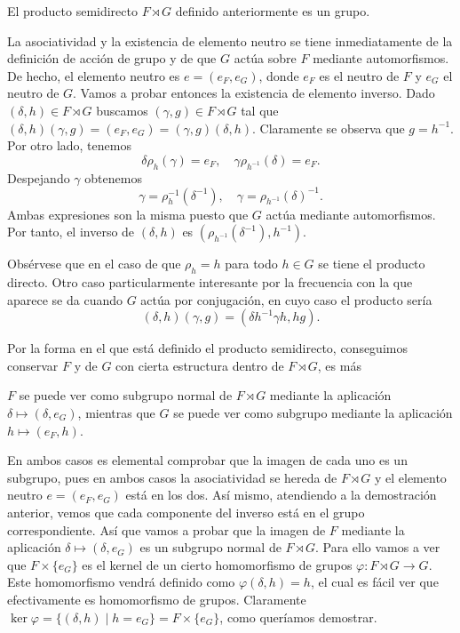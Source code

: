 \documentclass[TFG.tex]{subfiles}
\begin{document}
\begin{prop}
El producto semidirecto $F\rtimes G$ definido anteriormente es un grupo.
\end{prop}
\begin{dem}
La asociatividad y la existencia de elemento neutro se tiene inmediatamente de la definición de acción de grupo y de que $G$ actúa sobre $F$ mediante automorfismos. De hecho, el elemento neutro es $e=(e_F,e_G)$, donde $e_F$ es el neutro de $F$ y $e_G$ el neutro de $G$. Vamos a probar entonces la existencia de elemento inverso. Dado $(\delta,h)\in F\rtimes G$ buscamos $(\gamma,g)\in F\rtimes G$ tal que $(\delta,h)(\gamma,g)=(e_F,e_G)=(\gamma,g)(\delta,h)$. Claramente se observa que $g=h^{-1}$. Por otro lado, tenemos
\[
\delta\rho_h(\gamma)=e_F, \quad \gamma \rho_{h^{-1}}(\delta)=e_F.
\]
Despejando $\gamma$ obtenemos
\[
\gamma=\rho_{h}^{-1}(\delta^{-1}),\quad \gamma=\rho_{h^{-1}}(\delta)^{-1}.
\]
Ambas expresiones son la misma puesto que $G$ actúa mediante automorfismos. Por tanto, el inverso de $(\delta,h)$ es $(\rho_{h^{-1}}(\delta^{-1}), h^{-1})$. \QED
\end{dem}

 Obsérvese que en el caso de que $\rho_h=h$ para todo $h\in G$ se tiene el producto directo. Otro caso particularmente interesante por la frecuencia con la que aparece se da cuando $G$ actúa por conjugación, en cuyo caso el producto sería
\[
(\delta,h)(\gamma,g)=(\delta h^{-1}\gamma h,hg).
\]

Por la forma en el que está definido el producto semidirecto, conseguimos conservar $F$ y de $G$ con cierta estructura dentro de $F\rtimes G$, es más 
\begin{prop}
 $F$ se puede ver como subgrupo normal de $F\rtimes G$ mediante la aplicación $\delta\mapsto (\delta,e_G)$, mientras que $G$ se puede ver como subgrupo mediante la aplicación $h\mapsto (e_F,h)$.
\end{prop}
\begin{dem}
En ambos casos es elemental comprobar que la imagen de cada uno es un subgrupo, pues en ambos casos la asociatividad se hereda de $F\rtimes G$ y el elemento neutro $e=(e_F,e_G)$ está en los dos. Así mismo, atendiendo a la demostración anterior, vemos que cada componente del inverso está en el grupo correspondiente. Así que vamos a probar que la imagen de $F$ mediante la aplicación $\delta\mapsto (\delta,e_G)$ es un subgrupo normal de $F\rtimes G$. Para ello vamos a ver que $F\times\{e_G\}$ es el kernel de un cierto homomorfismo de grupos $\varphi:F\rtimes G\to G$. Este homomorfismo vendrá definido como $\varphi(\delta,h)=h$, el cual es fácil ver que efectivamente es homomorfismo de grupos. Claramente $\ker\varphi=\{(\delta,h)\mid h=e_G\}=F\times\{e_G\}$, como queríamos demostrar. 
\QED
\end{dem}
\end{document}
